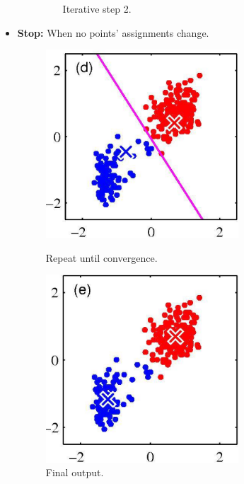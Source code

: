 \begin{itemize}
\begin{enumerate}
\begin{figure}[H]
\begin{minipage}[t]{0.42\linewidth}
				\caption{Iterative step 2.}
			\end{minipage}
		\end{figure}
		\FloatBarrier
	\end{enumerate}
	\item \textbf{Stop:} When no points' assignments change.
	\begin{figure}[H]
		\begin{minipage}[t]{0.42\linewidth} 
			\centering
			\includegraphics[width=0.68\textwidth]{img/ulearning/kmeans4}
			\caption{Repeat until convergence.}
		\end{minipage}        
		\hspace{2.5cm}
		\begin{minipage}[t]{0.42\linewidth} 
			\centering
			\includegraphics[width=0.68\textwidth]{img/ulearning/kmeans5}
			\caption{Final output.}
		\end{minipage}
	\end{figure}
\end{itemize}
